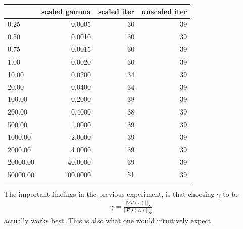 \documentclass[11pt,a4paper]{article}
\begin{document}
\begin{tabular}{lrrr}
\toprule
{} &  scaled gamma &  scaled iter &  unscaled iter \\
\midrule
0.25     &        0.0005 &           30 &             39 \\
0.50     &        0.0010 &           30 &             39 \\
0.75     &        0.0015 &           30 &             39 \\
1.00     &        0.0020 &           30 &             39 \\
10.00    &        0.0200 &           34 &             39 \\
20.00    &        0.0400 &           34 &             39 \\
100.00   &        0.2000 &           38 &             39 \\
200.00   &        0.4000 &           38 &             39 \\
500.00   &        1.0000 &           39 &             39 \\
1000.00  &        2.0000 &           39 &             39 \\
2000.00  &        4.0000 &           39 &             39 \\
20000.00 &       40.0000 &           39 &             39 \\
50000.00 &      100.0000 &           51 &             39 \\
\bottomrule
\end{tabular}
The important findings in the previous experiment, is that choosing $\gamma$ to be 
\begin{align*}
\gamma = \frac{||\nabla J(v)||_{\infty}}{||\nabla J(\Lambda)||_{\infty}}
\end{align*}
actually works best. This is also what one would intuitively expect.  
\end{document}
